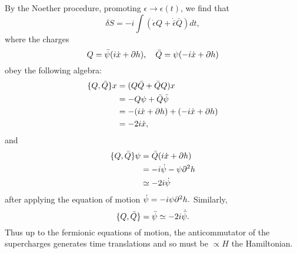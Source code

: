 By the Noether procedure, promoting $\epsilon\to \epsilon(t)$, we find that
\begin{equation}
    \delta S = -i \int(\dot \epsilon Q +\dot{\bar \epsilon} \bar Q)dt,
\end{equation}
where the charges
\begin{equation}
    Q=\bar \psi (i\dot x +\partial h),\quad \bar Q = \psi(-i\dot x + \partial h)
\end{equation}
obey the following algebra:
\begin{align*}
    \{Q,\bar Q\}x &= (Q \bar Q + \bar Q Q)x\\
    &= -Q \psi + \bar Q \bar \psi\\
    &= -(i\dot x + \partial h) +(-i \dot x + \partial h)\\
    &=-2i \dot x,
\end{align*}
and
\begin{align}
    \{Q,\bar Q\}\psi &= \bar Q(i\dot x + \partial h)\\
    &=-i \dot \psi -\psi \partial^2 h\\
    &\simeq -2i \dot \psi
\end{align}
after applying the equation of motion $\dot \psi = -i\psi \partial^2 h.$
Similarly,
\begin{equation}
    \{Q,\bar Q\}=\bar \psi \simeq -2i \dot{\bar \psi}.
\end{equation}
Thus up to the fermionic equations of motion, the anticommutator of the supercharges generates time translations and so must be $\propto H$ the Hamiltonian.

